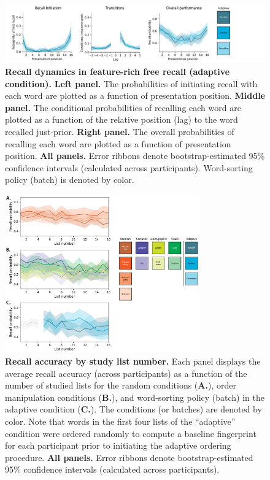 \documentclass{article}
\begin{document}
\begin{figure}[p] \centering
    \includegraphics[width=\textwidth]{figures/recall_dynamics_adaptive}
    
    \caption{\textbf{Recall dynamics in feature-rich free recall (adaptive condition).} \textbf{Left panel.} The probabilities of
    initiating recall with each word are plotted as a function of presentation
    position. \textbf{Middle panel.} The conditional probabilities of recalling
    each word are plotted as a function of the relative position (lag) to the word
    recalled just-prior. \textbf{Right panel.} The overall probabilities of
    recalling each word are plotted as a function of presentation position.
    \textbf{All panels.} Error ribbons denote bootstrap-estimated 95\% confidence
    intervals (calculated across participants). Word-sorting policy (batch) is denoted by color.}
    
        \label{fig:recall-dynamics-adaptive}
    \end{figure}


\begin{figure}[tp] \centering
    \includegraphics[width=0.75\textwidth]{figures/accuracy_by_list}
    
\caption{\textbf{Recall accuracy by study list number.} Each panel displays the
average recall accuracy (across participants) as a function of the number of
studied lists for the random conditions (\textbf{A.}), order manipulation
conditions (\textbf{B.}), and word-sorting policy (batch) in the adaptive condition (\textbf{C.}). The conditions (or batches)
are denoted by color. Note that words in the first four lists of the ``adaptive''
condition were ordered randomly to compute a baseline fingerprint for each
participant prior to initiating the adaptive ordering procedure. \textbf{All
panels.} Error ribbons denote bootstrap-estimated 95\% confidence
intervals (calculated across participants).} 
\label{fig:accuracy-by-list}

\end{figure}
\end{document}
